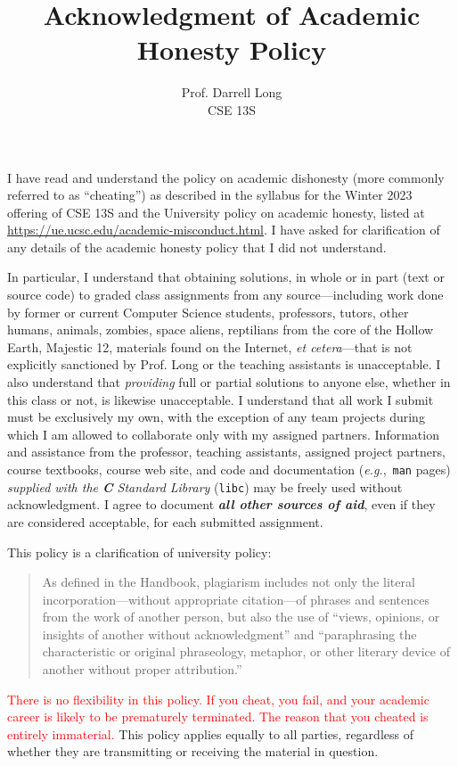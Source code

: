 \documentclass[11pt]{article}
\title{Acknowledgment of Academic Honesty Policy}
\author{Prof.\xspace Darrell Long \\
CSE 13S}
\date{\quarter}
\newcommand{\surl}[1]{{\fontsize{9}{11}\selectfont\url{#1}}}
\newcommand{\quarter}{Winter 2023}
\begin{document}
\maketitle

I have read and understand the policy on academic dishonesty (more
commonly referred to as ``cheating'') as described in the syllabus for
the \quarter{} offering of CSE 13S and the University policy on academic
honesty, listed at \surl{https://ue.ucsc.edu/academic-misconduct.html}.
I have asked for clarification of any details of the academic honesty
policy that I did not understand.

In particular, I understand that obtaining solutions, in whole or in
part (text or source code) to graded class assignments from any
source---including work done by former or current Computer Science
students, professors, tutors, other humans, animals, zombies, space
aliens, reptilians from the core of the Hollow Earth, Majestic 12, materials found on
the Internet, \emph{et cetera}---that is not explicitly sanctioned by
Prof.\xspace Long or the teaching assistants is unacceptable. I also
understand that \emph{providing} full or partial solutions to anyone
else, whether in this class or not, is likewise unacceptable. I
understand that all work I submit must be exclusively my own, with the
exception of any team projects during which I am allowed to collaborate
only with my assigned partners.  Information and assistance from the
professor, teaching assistants, assigned project partners, course
textbooks, course web site, and code and documentation
(\emph{e.g.},~\texttt{man} pages) \emph{supplied with the \textbf{C}
Standard Library} (\texttt{libc}) may be freely used without
acknowledgment.  I agree to document \textbf{\emph{all other sources of
aid}}, even if they are considered acceptable, for each submitted
assignment.

This policy is a clarification of university policy: \begin{quote} As
  defined in the Handbook, plagiarism includes not only the literal
  incorporation---without appropriate citation---of phrases and
  sentences from the work of another person, but also the use of
  ``views, opinions, or insights of another without acknowledgment'' and
  ``paraphrasing the characteristic or original phraseology, metaphor,
  or other literary device of another without proper attribution.''
\end{quote}


\textcolor{red}{There is no flexibility in this policy. If you cheat,
you fail, and your academic career is likely to be prematurely
terminated. The reason that you cheated is entirely immaterial.} This
policy applies equally to all parties, regardless of whether they are
transmitting or receiving the material in question.
\end{document}
